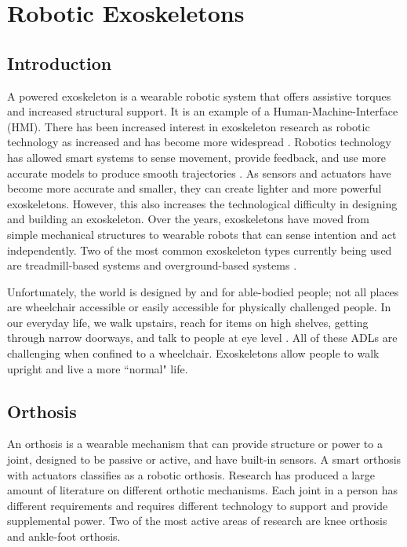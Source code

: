 \section{Robotic Exoskeletons}
\label{sec:ExoBack}
\subsection{Introduction}

A powered exoskeleton is a wearable robotic system that offers assistive torques and increased structural support. It is an example of a Human-Machine-Interface (HMI). There has been increased interest in exoskeleton research as robotic technology as increased and has become more widespread \cite{aliman2017design} \cite{chen2016recent} \cite{mertz2012next} \cite{gardner2017review}. Robotics technology has allowed smart systems to sense movement, provide feedback, and use more accurate models to produce smooth trajectories \cite{5462998}. As sensors and actuators have become more accurate and smaller, they can create lighter and more powerful exoskeletons. However, this also increases the technological difficulty in designing and building an exoskeleton. Over the years, exoskeletons have moved from simple mechanical structures to wearable robots that can sense intention and act independently. Two of the most common exoskeleton types currently being used are treadmill-based systems and overground-based systems \cite{diaz2011lower}.

Unfortunately, the world is designed by and for able-bodied people; not all places are wheelchair accessible or easily accessible for physically challenged people. In our everyday life, we walk upstairs, reach for items on high shelves, getting through narrow doorways, and talk to people at eye level \cite{welage2011wheelchair}. All of these ADLs are challenging when confined to a wheelchair. Exoskeletons allow people to walk upright and live a more ``normal" life. 


\subsection{Orthosis}

An orthosis is a wearable mechanism that can provide structure or power to a joint, designed to be passive or active, and have built-in sensors. A smart orthosis with actuators classifies as a robotic orthosis. Research has produced a large amount of literature on different orthotic mechanisms. Each joint in a person has different requirements and requires different technology to support and provide supplemental power. Two of the most active areas of research are knee orthosis and ankle-foot orthosis. 



